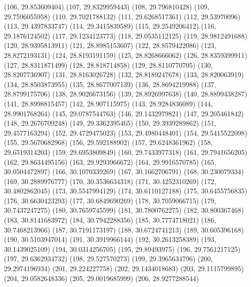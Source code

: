 {					(106, 29.853609404)
					(107, 29.8329959443)
					(108, 29.796810428)
					(109, 29.7596055958)
					(110, 29.7021788132)
					(111, 29.6268517361)
					(112, 29.53970096)
					(113, 29.4397833747)
					(114, 29.3415839589)
					(115, 29.2549206412)
					(116, 29.1876124502)
					(117, 29.1234123773)
					(118, 29.0535112125)
					(119, 28.9812491688)
					(120, 28.9395813911)
					(121, 28.8985153607)
					(122, 28.8579422086)
					(123, 28.8272193131)
					(124, 28.8193191159)
					(125, 28.8268666062)
					(126, 28.8359399911)
					(127, 28.8311871499)
					(128, 28.818714858)
					(129, 28.8110770705)
					(130, 28.8207736907)
					(131, 28.8163026728)
					(132, 28.8189247678)
					(133, 28.820063919)
					(134, 28.8503873955)
					(135, 28.8677007139)
					(136, 28.8694219988)
					(137, 28.8799175706)
					(138, 28.9026673156)
					(139, 28.8926997638)
					(140, 28.8899438287)
					(141, 28.8998815457)
					(142, 28.907115975)
					(143, 28.9284836089)
					(144, 28.9901768264)
					(145, 29.0787544763)
					(146, 29.1432979821)
					(147, 29.205461842)
					(148, 29.2676709248)
					(149, 29.3362395465)
					(150, 29.3939289862)
					(151, 29.4577163294)
					(152, 29.4729475023)
					(153, 29.4980448401)
					(154, 29.5415522098)
					(155, 29.5670682968)
					(156, 29.592188902)
					(157, 29.6248361962)
					(158, 29.6519314203)
					(159, 29.6953809849)
					(160, 29.7433977318)
					(161, 29.7941656205)
					(162, 29.8634495156)
					(163, 29.9293966672)
					(164, 29.9916570785)
					(165, 30.0504472897)
					(166, 30.1070339269)
					(167, 30.1662706791)
					(168, 30.230079334)
					(169, 30.2889976777)
					(170, 30.3536634318)
					(171, 30.4252310269)
					(172, 30.4802862045)
					(173, 30.5547994129)
					(174, 30.6110127188)
					(175, 30.6455756835)
					(176, 30.6630423293)
					(177, 30.6849690269)
					(178, 30.7059066715)
					(179, 30.7437247275)
					(180, 30.7659745599)
					(181, 30.7800762275)
					(182, 30.800367468)
					(183, 30.8141683972)
					(184, 30.7942288356)
					(185, 30.7774718021)
					(186, 30.7468213966)
					(187, 30.7191173197)
					(188, 30.6724741213)
					(189, 30.605396168)
					(190, 30.5103947014)
					(191, 30.3919966144)
					(192, 30.2613258389)
					(193, 30.1439025109)
					(194, 30.0314256705)
					(195, 29.89493975)
					(196, 29.7561217125)
					(197, 29.6362934732)
					(198, 29.527570273)
					(199, 29.3965634796)
					(200, 29.2974196934)
					(201, 29.224227758)
					(202, 29.1434018683)
					(203, 29.1115799895)
					(204, 29.0582648336)
					(205, 29.0019685999)
					(206, 28.9277288544)
}
